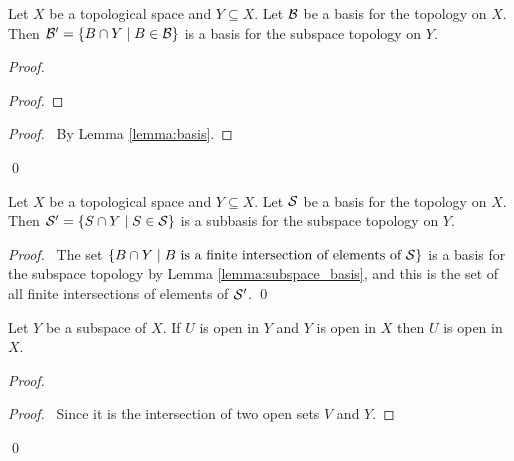 \begin{lemma}
    \label{lemma:subspace_basis}
    Let $X$ be a topological space and $Y \subseteq X$. Let $\mathcal{B}$ be a basis for the topology on $X$.
    Then $\mathcal{B}' = \{ B \cap Y \mid B \in \mathcal{B} \}$ is a basis for the subspace topology on $Y$.
\end{lemma}

\begin{proof}
    \pf
    \begin{proof}
    \end{proof}
    \qedstep
    \begin{proof}
        \pf\ By Lemma \ref{lemma:basis}.
    \end{proof}
    \qed
\end{proof}

\begin{lemma}
    \label{lemma:subspace_subbasis}
    Let $X$ be a topological space and $Y \subseteq X$. Let $\mathcal{S}$ be a basis for the topology on $X$.
    Then $\mathcal{S}' = \{ S \cap Y \mid S \in \mathcal{S} \}$ is a subbasis for the subspace topology on $Y$.
\end{lemma}

\begin{proof}
    \pf\ The set $\{ B \cap Y \mid B \text{ is a finite intersection of elements of } \mathcal{S} \}$ is a basis
    for the subspace topology by Lemma \ref{lemma:subspace_basis}, and this is the set of all finite
    intersections of elements of $\mathcal{S}'$. \qed
\end{proof}

\begin{lemma}
    \label{lemma:subspace_open}
    Let $Y$ be a subspace of $X$. If $U$ is open in $Y$ and $Y$ is open in $X$ then $U$ is open in $X$.
\end{lemma}

\begin{proof}
    \pf
    \begin{proof}
        \pf\ Since it is the intersection of two open sets $V$ and $Y$.
    \end{proof}
    \qed
\end{proof}

